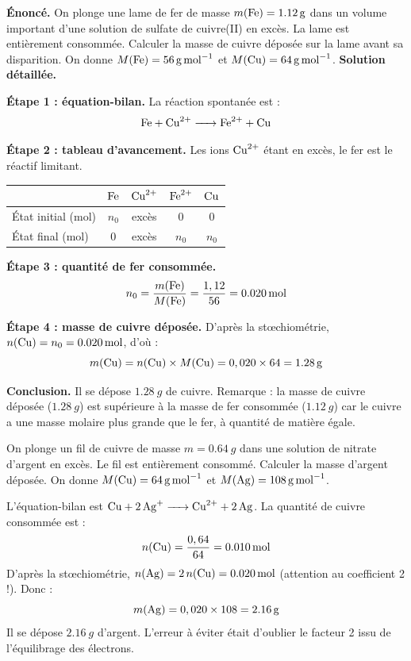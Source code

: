 \documentclass[11pt]{article}
\begin{document}
\begin{exoresolu}
\textbf{Énoncé.} On plonge une lame de fer de masse $m(\ce{Fe}) = \SI{1,12}{g}$ dans un volume important d'une solution de sulfate de cuivre(II) en excès. La lame est entièrement consommée. Calculer la masse de cuivre déposée sur la lame avant sa disparition. On donne $M(\ce{Fe}) = \SI{56}{g.mol^{-1}}$ et $M(\ce{Cu}) = \SI{64}{g.mol^{-1}}$.
\tcblower
\textbf{Solution détaillée.}

\textbf{Étape 1 : équation-bilan.} La réaction spontanée est :
\[ \ce{Fe + Cu^2+ -> Fe^2+ + Cu} \]

\textbf{Étape 2 : tableau d'avancement.} Les ions $\ce{Cu^2+}$ étant en excès, le fer est le réactif limitant.

\begin{center}
\begin{tabular}{lcccc}
\toprule
 & $\ce{Fe}$ & $\ce{Cu^2+}$ & $\ce{Fe^2+}$ & $\ce{Cu}$ \\
\midrule
État initial (mol) & $n_0$ & excès & $0$ & $0$ \\
État final (mol) & $0$ & excès & $n_0$ & $n_0$ \\
\bottomrule
\end{tabular}
\end{center}

\textbf{Étape 3 : quantité de fer consommée.}
\[ n_0 = \frac{m(\ce{Fe})}{M(\ce{Fe})} = \frac{1,12}{56} = \SI{0,020}{mol} \]

\textbf{Étape 4 : masse de cuivre déposée.} D'après la stœchiométrie, $n(\ce{Cu}) = n_0 = \SI{0,020}{mol}$, d'où :
\[ m(\ce{Cu}) = n(\ce{Cu}) \times M(\ce{Cu}) = 0,020 \times 64 = \SI{1,28}{g} \]

\textbf{Conclusion.} Il se dépose $\SI{1,28}{g}$ de cuivre. Remarque : la masse de cuivre déposée ($\SI{1,28}{g}$) est supérieure à la masse de fer consommée ($\SI{1,12}{g}$) car le cuivre a une masse molaire plus grande que le fer, à quantité de matière égale.
\end{exoresolu}

\begin{exercice}
On plonge un fil de cuivre de masse $m = \SI{0,64}{g}$ dans une solution de nitrate d'argent en excès. Le fil est entièrement consommé. Calculer la masse d'argent déposée. On donne $M(\ce{Cu}) = \SI{64}{g.mol^{-1}}$ et $M(\ce{Ag}) = \SI{108}{g.mol^{-1}}$.
\end{exercice}

\begin{corrige}[Exercice]
L'équation-bilan est $\ce{Cu + 2 Ag+ -> Cu^2+ + 2 Ag}$. La quantité de cuivre consommée est :
\[ n(\ce{Cu}) = \frac{0,64}{64} = \SI{0,010}{mol} \]
D'après la stœchiométrie, $n(\ce{Ag}) = 2\, n(\ce{Cu}) = \SI{0,020}{mol}$ (attention au coefficient 2 !). Donc :
\[ m(\ce{Ag}) = 0,020 \times 108 = \SI{2,16}{g} \]
Il se dépose $\SI{2,16}{g}$ d'argent. L'erreur à éviter était d'oublier le facteur 2 issu de l'équilibrage des électrons.
\end{corrige}
\end{document}

